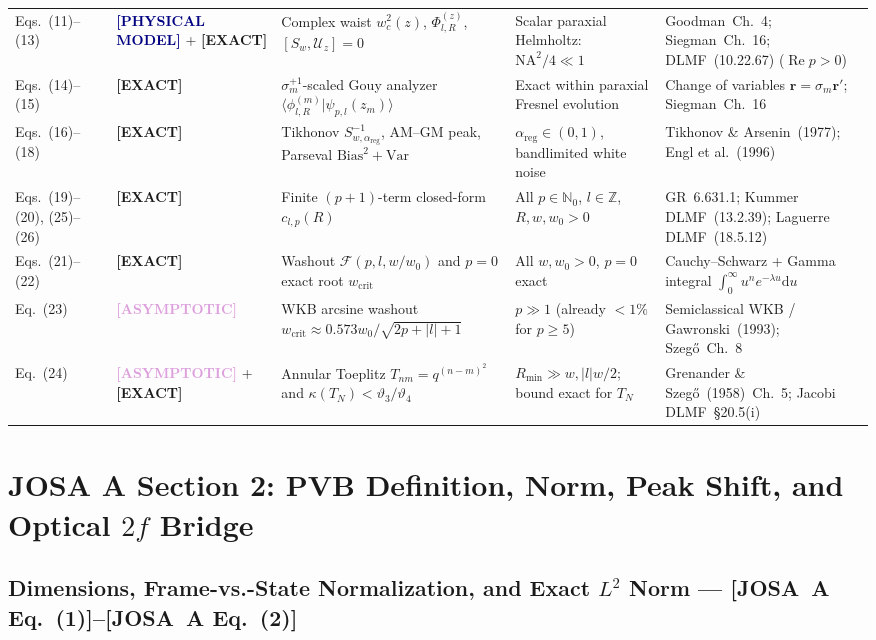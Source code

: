\documentclass[10pt,letterpaper]{article}
\newcommand{\braket}[2]{\langle #1 | #2 \rangle}
\newcommand{\abs}[1]{\lvert #1 \rvert}
\newcommand{\dd}{\mathrm{d}}
\newcommand{\josa}[1]{\textbf{[JOSA~A Eq.~(#1)]}}
\newcommand{\tagexact}{\textcolor{forest}{\textbf{[EXACT]}}}
\newcommand{\tagmodel}{\textcolor{navy}{\textbf{[PHYSICAL MODEL]}}}
\newcommand{\tagasymp}{\textcolor{plum}{\textbf{[ASYMPTOTIC]}}}
\numberwithin{equation}{section}
\begin{document}
\begin{center}
\begin{longtable}{@{}p{1.5cm}p{2.05cm}p{4.3cm}p{3.6cm}p{4.1cm}@{}}
Eqs.~(11)--(13) & \tagmodel{} + \tagexact{} & Complex waist $w_c^2(z)$, $\Phi_{l,R}^{(z)}$, $[S_w,\mathcal{U}_z]=0$ & Scalar paraxial Helmholtz: $\mathrm{NA}^2/4 \ll 1$ & Goodman~Ch.~4; Siegman~Ch.~16; DLMF~(10.22.67) ($\operatorname{Re} p > 0$) \\
Eqs.~(14)--(15) & \tagexact{} & $\sigma_m^{+1}$-scaled Gouy analyzer $\braket{\phi_{l,R}^{(m)}}{\psi_{p,l}(z_m)}$ & Exact within paraxial Fresnel evolution & Change of variables $\mathbf{r} = \sigma_m\mathbf{r}'$; Siegman~Ch.~16 \\
Eqs.~(16)--(18) & \tagexact{} & Tikhonov $S_{w,\alpha_{\mathrm{reg}}}^{-1}$, AM--GM peak, Parseval $\mathrm{Bias}^2+\mathrm{Var}$ & $\alpha_{\mathrm{reg}} \in (0,1)$, bandlimited white noise & Tikhonov \& Arsenin~(1977); Engl et al.~(1996) \\
Eqs.~(19)--(20), (25)--(26) & \tagexact{} & Finite $(p+1)$-term closed-form $c_{l,p}(R)$ & All $p \in \mathbb{N}_0$, $l \in \mathbb{Z}$, $R,w,w_0 > 0$ & GR~6.631.1; Kummer DLMF~(13.2.39); Laguerre DLMF~(18.5.12) \\
Eqs.~(21)--(22) & \tagexact{} & Washout $\mathcal{F}(p,l,w/w_0)$ and $p=0$ exact root $w_{\mathrm{crit}}$ & All $w,w_0 > 0$, $p=0$ exact & Cauchy--Schwarz + Gamma integral $\int_0^\infty u^n e^{-\lambda u}\dd u$ \\
Eq.~(23) & \tagasymp{} & WKB arcsine washout $w_{\mathrm{crit}} \approx 0.573 w_0/\sqrt{2p+\abs{l}+1}$ & $p \gg 1$ (already $<1\%$ for $p \ge 5$) & Semiclassical WKB / Gawronski~(1993); Szeg\H{o}~Ch.~8 \\
Eq.~(24) & \tagasymp{} + \tagexact{} & Annular Toeplitz $T_{nm} = q^{(n-m)^2}$ and $\kappa(T_N) < \vartheta_3/\vartheta_4$ & $R_{\min} \gg w, \abs{l}w/2$; bound exact for $T_N$ & Grenander \& Szeg\H{o}~(1958)~Ch.~5; Jacobi DLMF~\S20.5(i) \\
\end{longtable}
\end{center}

\section{JOSA A Section 2: PVB Definition, Norm, Peak Shift, and Optical $2f$ Bridge}
\label{sec:v2_s2}

\subsection{Dimensions, Frame-vs.-State Normalization, and Exact $L^2$ Norm --- \josa{1}--\josa{2}}
\end{document}
